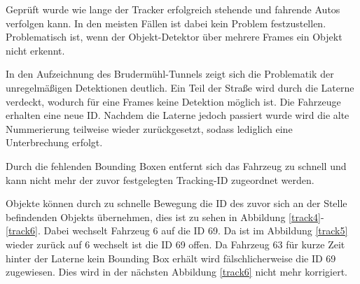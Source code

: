 \documentclass[conference]{IEEEtran}
\begin{document}
	Geprüft wurde wie lange der Tracker erfolgreich stehende und fahrende Autos verfolgen kann. In den meisten Fällen ist dabei kein Problem festzustellen. Problematisch ist, wenn der Objekt-Detektor über mehrere Frames ein Objekt nicht erkennt.
	
	In den Aufzeichnung des Brudermühl-Tunnels zeigt sich die Problematik der
	unregelmäßigen Detektionen deutlich. Ein Teil der Straße wird durch die Laterne
	verdeckt, wodurch für eine Frames keine Detektion möglich ist. Die Fahrzeuge
	erhalten eine neue ID. Nachdem die Laterne jedoch passiert wurde wird die alte
	Nummerierung teilweise wieder zurückgesetzt, sodass lediglich eine Unterbrechung
	erfolgt.
	
	Durch die fehlenden Bounding Boxen entfernt sich das Fahrzeug zu schnell und kann nicht
	mehr der zuvor festgelegten Tracking-ID zugeordnet werden.

	Objekte können durch zu schnelle Bewegung die ID des zuvor sich an der Stelle
	befindenden Objekts übernehmen, dies ist zu sehen in Abbildung \ref{track4}-\ref{track6}.
	Dabei wechselt Fahrzeug 6 auf die ID 69. Da ist im Abbildung \ref{track5} wieder zurück auf 6
	wechselt ist die ID 69 offen. Da Fahrzeug 63 für kurze Zeit hinter der Laterne kein Bounding Box erhält wird fälschlicherweise die ID 69 zugewiesen.
	Dies wird in der nächsten Abbildung \ref{track6} nicht mehr korrigiert.
	
\end{document}
